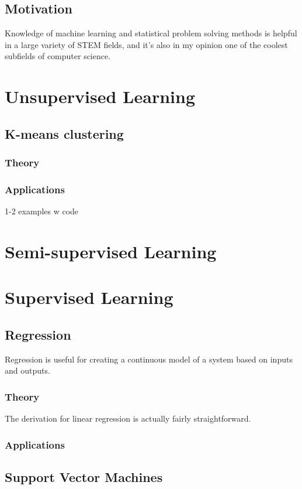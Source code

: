 \documentclass[11pt]{article}
\begin{document}
\subsection{Motivation}
Knowledge of machine learning and statistical problem solving methods is helpful in a large variety of STEM fields, and it's also in my opinion one of the coolest subfields of computer science.

\section{Unsupervised Learning}
\subsection{K-means clustering}
\subsubsection{Theory}
\subsubsection{Applications}
1-2 examples w code

\section{Semi-supervised Learning}

\section{Supervised Learning}
\subsection{Regression}
Regression is useful for creating a continuous model of a system based on inputs and outputs.
\subsubsection{Theory}
The derivation for linear regression is actually fairly straightforward.
\subsubsection{Applications}

\subsection{Support Vector Machines}
\end{document}
